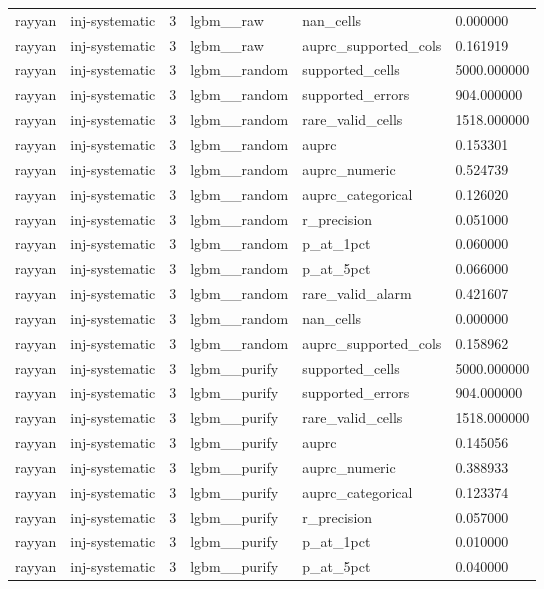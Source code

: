 \begin{tabular}{llllll}
rayyan & inj-systematic & 3 & lgbm\_\_raw & nan\_cells & 0.000000 \\
rayyan & inj-systematic & 3 & lgbm\_\_raw & auprc\_supported\_cols & 0.161919 \\
rayyan & inj-systematic & 3 & lgbm\_\_random & supported\_cells & 5000.000000 \\
rayyan & inj-systematic & 3 & lgbm\_\_random & supported\_errors & 904.000000 \\
rayyan & inj-systematic & 3 & lgbm\_\_random & rare\_valid\_cells & 1518.000000 \\
rayyan & inj-systematic & 3 & lgbm\_\_random & auprc & 0.153301 \\
rayyan & inj-systematic & 3 & lgbm\_\_random & auprc\_numeric & 0.524739 \\
rayyan & inj-systematic & 3 & lgbm\_\_random & auprc\_categorical & 0.126020 \\
rayyan & inj-systematic & 3 & lgbm\_\_random & r\_precision & 0.051000 \\
rayyan & inj-systematic & 3 & lgbm\_\_random & p\_at\_1pct & 0.060000 \\
rayyan & inj-systematic & 3 & lgbm\_\_random & p\_at\_5pct & 0.066000 \\
rayyan & inj-systematic & 3 & lgbm\_\_random & rare\_valid\_alarm & 0.421607 \\
rayyan & inj-systematic & 3 & lgbm\_\_random & nan\_cells & 0.000000 \\
rayyan & inj-systematic & 3 & lgbm\_\_random & auprc\_supported\_cols & 0.158962 \\
rayyan & inj-systematic & 3 & lgbm\_\_purify & supported\_cells & 5000.000000 \\
rayyan & inj-systematic & 3 & lgbm\_\_purify & supported\_errors & 904.000000 \\
rayyan & inj-systematic & 3 & lgbm\_\_purify & rare\_valid\_cells & 1518.000000 \\
rayyan & inj-systematic & 3 & lgbm\_\_purify & auprc & 0.145056 \\
rayyan & inj-systematic & 3 & lgbm\_\_purify & auprc\_numeric & 0.388933 \\
rayyan & inj-systematic & 3 & lgbm\_\_purify & auprc\_categorical & 0.123374 \\
rayyan & inj-systematic & 3 & lgbm\_\_purify & r\_precision & 0.057000 \\
rayyan & inj-systematic & 3 & lgbm\_\_purify & p\_at\_1pct & 0.010000 \\
rayyan & inj-systematic & 3 & lgbm\_\_purify & p\_at\_5pct & 0.040000 \\

\end{tabular}
